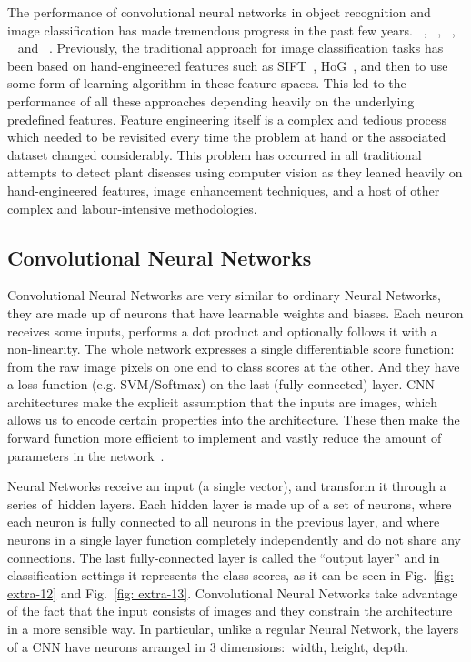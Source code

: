 The performance of convolutional neural networks in object recognition and image classification has made tremendous progress in the past few years. ~\cite{hughes2015open}, ~\cite{facts2015figures}, ~\cite{jia2014caffe}, ~\cite{krizhevsky2012imagenet} and ~\cite{lecun1989backpropagation}. Previously, the traditional approach for image classification tasks has been based on hand-engineered features such as SIFT~\cite{lecun2015deep}, HoG~\cite{lin2013network}, and then to use some form of learning algorithm in these feature spaces. This led to the performance of all these approaches depending heavily on the underlying predefined features. Feature engineering itself is a complex and tedious process which needed to be revisited every time the problem at hand or the associated dataset changed considerably. This problem has occurred in all traditional attempts to detect plant diseases using computer vision as they leaned heavily on hand-engineered features, image enhancement techniques, and a host of other complex and labour-intensive methodologies. 

\subsection{Convolutional Neural Networks}
Convolutional Neural Networks are very similar to ordinary Neural Networks, they are made up of neurons that have learnable weights and biases. Each neuron receives some inputs, performs a dot product and optionally follows it with a non-linearity. The whole network expresses a single differentiable score function: from the raw image pixels on one end to class scores at the other. And they have a loss function (e.g. SVM/Softmax) on the last (fully-connected) layer. CNN architectures make the explicit assumption that the inputs are images, which allows us to encode certain properties into the architecture. These then make the forward function more efficient to implement and vastly reduce the amount of parameters in the network~\cite{CS231nCo51:online}.


Neural Networks receive an input (a single vector), and transform it through a series of hidden layers. Each hidden layer is made up of a set of neurons, where each neuron is fully connected to all neurons in the previous layer, and where neurons in a single layer function completely independently and do not share any connections. The last fully-connected layer is called the ``output layer'' and in classification settings it represents the class scores, as it can be seen in Fig.~\ref{fig: extra-12} and Fig.~\ref{fig: extra-13}. Convolutional Neural Networks take advantage of the fact that the input consists of images and they constrain the architecture in a more sensible way. In particular, unlike a regular Neural Network, the layers of a CNN have neurons arranged in 3 dimensions: width, height, depth. 

